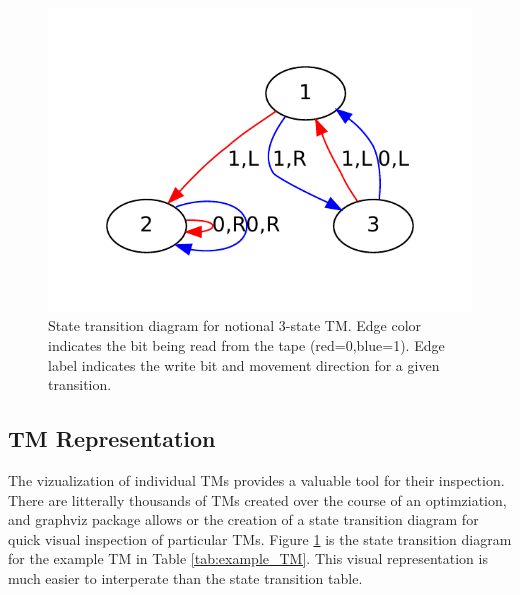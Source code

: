\begin{figure}[!hbt]
	\centering 
	\includegraphics[width=.7\textwidth]{images/example_TM}
	\caption{State transition diagram for notional 3-state TM. Edge color indicates the bit being read from the tape (red=0,blue=1). Edge label indicates the write bit and movement direction for a given transition.}
	\label{fig:example_TM}
\end{figure}

\subsection{TM Representation}
The vizualization of individual TMs provides a valuable tool for their inspection. There are litterally thousands of TMs created over the course of an optimziation, and graphviz package allows or the creation of a state transition diagram for quick visual inspection of particular TMs. Figure \ref{fig:example_TM} is the state transition diagram for the example TM in Table \ref{tab:example_TM}. This visual representation is much easier to interperate than the state transition table. 
